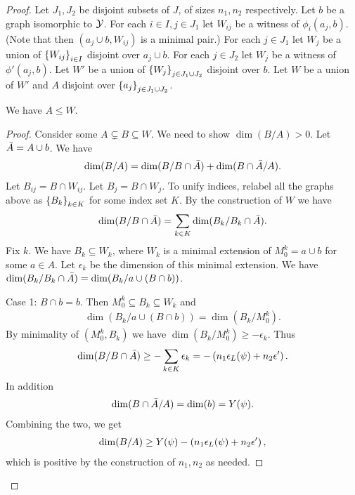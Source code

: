 \begin{proof}
  Let $J_1, J_2$ be disjoint subsets of $J$, of sizes $n_1, n_2$ respectively.
  Let $b$ be a graph isomorphic to $\mathcal Y$.
  For each $i \in I, j \in J_1$ let $W_{ij}$ be a witness of $\phi_i(a_j, b)$.
  (Note that then $(a_j \cup b, W_{ij})$ is a minimal pair.)
  For each $j \in J_1$ let $W_j$ be a union of $\left\{W_{ij}\right\}_{i \in I}$ disjoint over $a_j \cup b$.
  For each $j \in J_2$ let $W_{j}$ be a witness of $\phi'(a_j, b)$.
  Let $W'$ be a union of $\left\{W_j\right\}_{j \in J_1 \cup J_2}$ disjoint over $b$.
  Let $W$ be a union of $W'$ and $A$ disjoint over $\left\{a_j\right\}_{j \in J_1 \cup J_2}$.
  \begin{Claim}
    We have $A \leq W$.
  \end{Claim}
  \begin{proof}
    Consider some $A \subsetneq B \subseteq W$.
    We need to show $\dim (B/A) > 0$.
    Let $\bar A = A \cup b$.
    We have
    \begin{align*}
      \dim(B/A) = \dim(B/ B \cap \bar A) + \dim(B \cap \bar A / A).
    \end{align*}
    Let $B_{ij} = B \cap W_{ij}$.
    Let $B_{j} = B \cap W_{j}$.
    To unify indices, relabel all the graphs above as $\left\{B_k\right\}_{k \in K}$ for some index set $K$.
    By the construction of $W$ we have
    \begin{align*}
      \dim(B/ B \cap \bar A) = \sum_{k \in K} \dim(B_k/ B_k \cap \bar A).
    \end{align*}
    Fix $k$.
    We have $B_k \subseteq W_k$, where $W_k$ is a minimal extension of $M^k_0 = a \cup b$ for some $a \in A$.
    Let $\epsilon_k$ be the dimension of this minimal extension.
    We have $\dim(B_k / B_k \cap \bar A) = \dim(B_k / a \cup (B \cap b))$.

    Case 1: $B \cap b = b$.
    Then $M_0^k \subseteq B_k \subseteq W_k$ and
    \begin{align*}
      \dim(B_k / a \cup (B \cap b)) = \dim (B_k/M_0^k).
    \end{align*}
    By minimality of $(M_0^k, B_k)$ we have $\dim (B_k/M_0^k) \geq -\epsilon_k$.
    Thus
    \begin{align*}
      \dim(B/ B \cap \bar A) \geq - \sum_{k \in K} \epsilon_k = -\left(n_1 \epsilon_L(\psi) + n_2 \epsilon'\right).
    \end{align*}
    In addition
    \begin{align*}
      \dim(B \cap \bar A / A) = \dim (b) = Y(\psi).
    \end{align*}
    Combining the two, we get
    \begin{align*}
      \dim(B/A) \geq Y(\psi) - \left(n_1 \epsilon_L(\psi) + n_2 \epsilon'\right),
    \end{align*}
    which is positive by the construction of $n_1, n_2$ as needed.
    

\end{proof}
\end{proof}
